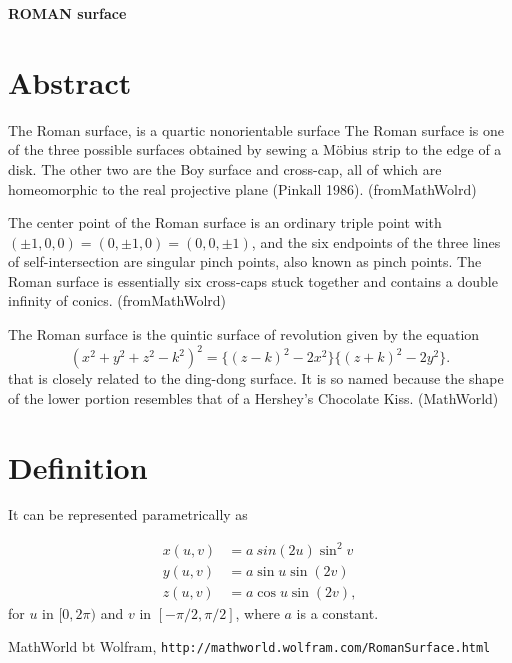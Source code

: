 \documentclass[12pt,dvipdfmx]{article}
\begin{document}
\begin{center}

{\bf \Large ROMAN surface}

\end{center}


\section{Abstract}

The Roman surface, is a quartic nonorientable surface The Roman surface is one of the three possible surfaces obtained by sewing a Möbius strip to the edge of a disk. The other two are the Boy surface and cross-cap, all of which are homeomorphic to the real projective plane (Pinkall 1986). (fromMathWolrd)

The center point of the Roman surface is an ordinary triple point with $(\pm1,0,0)=(0, \pm 1,0)=(0,0, \pm 1)$, and the six endpoints of the three lines of self-intersection are singular pinch points, also known as pinch points. The Roman surface is essentially six cross-caps stuck together and contains a double infinity of conics. (fromMathWolrd)


The Roman surface is the quintic surface of revolution given by the equation
\[
 (x^2+y^2+z^2-k^2)^2=\{(z-k)^2-2x^2\}\{(z+k)^2-2y^2\}.  	
\]
that is closely related to the ding-dong surface. It is so named because the shape of the lower portion resembles that of a Hershey's Chocolate Kiss. (MathWorld)

\section{Definition}

It can be represented parametrically as

\begin{align*}
x(u,v)	&=	a\ sin(2u) \sin^2v	\\ 
y(u,v)	&=	a\sin u \sin(2v)	\\
z(u,v)	&=	a\cos u \sin(2v),
\end{align*}
for $u$ in $[0,2\pi)$ and $v$ in $[-\pi/2,\pi/2]$, where $a$ is a constant.


\begin{thebibliography}{9}

 MathWorld bt Wolfram, \verb|http://mathworld.wolfram.com/RomanSurface.html|


\end{thebibliography}
\end{document}
